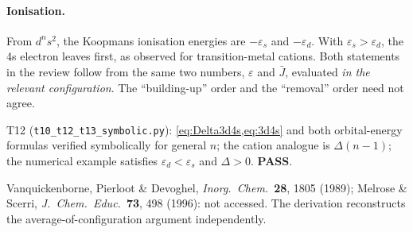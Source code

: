 \paragraph{Ionisation.} From $d^ns^2$, the Koopmans ionisation energies are $-\varepsilon_s$ and $-\varepsilon_d$.
With $\varepsilon_s>\varepsilon_d$, the 4s electron leaves first, as observed for transition-metal cations.
Both statements in the review follow from the same two numbers, $\varepsilon$ and $\bar J$, evaluated
\emph{in the relevant configuration}. The ``building-up'' order and the ``removal'' order need not agree.
\begin{verifybox}
T12 (\texttt{t10\_t12\_t13\_symbolic.py}): \cref{eq:Delta3d4s,eq:3d4s} and both orbital-energy formulas
verified symbolically for general $n$; the cation analogue is $\Delta(n-1)$; the numerical example satisfies
$\varepsilon_d<\varepsilon_s$ and $\Delta>0$. \textbf{PASS}.
\end{verifybox}
\begin{sourcebox}
Vanquickenborne, Pierloot \& Devoghel, \emph{Inorg.\ Chem.}\ \textbf{28}, 1805 (1989); Melrose \& Scerri,
\emph{J.\ Chem.\ Educ.}\ \textbf{73}, 498 (1996): not accessed. The derivation reconstructs the
average-of-configuration argument independently.
\end{sourcebox}
